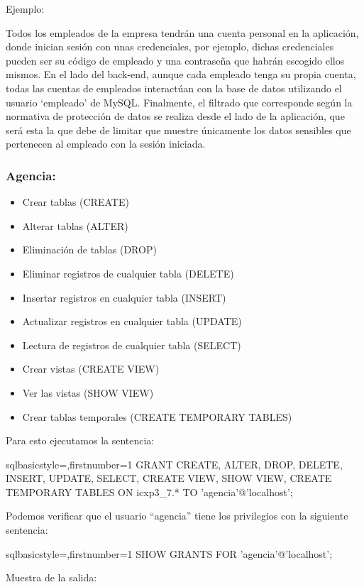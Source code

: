 	\newp Ejemplo:
	
	\newp Todos los empleados de la empresa tendrán una cuenta personal en la aplicación, donde inician sesión con unas credenciales, por ejemplo, dichas credenciales pueden ser su código de empleado y una contraseña que habrán escogido ellos mismos. En el lado del back-end, aunque cada empleado tenga su propia cuenta, todas las cuentas de empleados interactúan con la base de datos utilizando el usuario ‘empleado’ de MySQL. Finalmente, el filtrado que corresponde según la normativa de protección de datos se realiza desde el lado de la aplicación, que será esta la que debe de limitar que muestre únicamente los datos sensibles que pertenecen al empleado con la sesión iniciada.
	
	\subsubsection*{Agencia:}
		\begin{itemize}
			\item Crear tablas (CREATE)
			\item Alterar tablas (ALTER)
			\item Eliminación de tablas (DROP)
			\item Eliminar registros de cualquier tabla (DELETE)
			\item Insertar registros en cualquier tabla (INSERT)
			\item Actualizar registros en cualquier tabla (UPDATE)
			\item Lectura de registros de cualquier tabla (SELECT)
			\item Crear vistas (CREATE VIEW)
			\item Ver las vistas (SHOW VIEW)
			\item Crear tablas temporales (CREATE TEMPORARY TABLES)
		\end{itemize}
	
	Para esto ejecutamos la sentencia:
	\begin{sourcecodep}[]{sql}{basicstyle={\fontsize{10}{10}\selectfont\ttfamily},firstnumber=1}{}
		GRANT CREATE, ALTER, DROP, DELETE, INSERT, UPDATE, SELECT, CREATE VIEW, SHOW VIEW, CREATE TEMPORARY TABLES
			ON icxp3_7.* TO 'agencia'@'localhost';\end{sourcecodep}
	Podemos verificar que el usuario “agencia” tiene los privilegios con la siguiente sentencia:
	
	\begin{sourcecodep}[]{sql}{basicstyle={\fontsize{10}{10}\selectfont\ttfamily},firstnumber=1}{}
		SHOW GRANTS FOR 'agencia'@'localhost';\end{sourcecodep}
	\newp Muestra de la salida:
	

